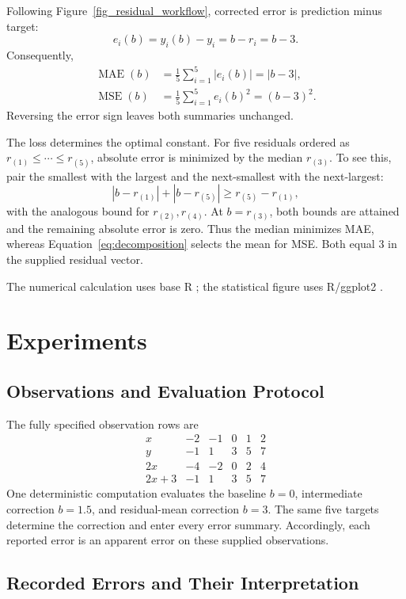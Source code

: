 \documentclass[11pt]{article}
\begin{document}
Following Figure~\ref{fig_residual_workflow}, corrected error is prediction minus target:
\[
e_i(b)=\hat y_i(b)-y_i=b-r_i=b-3.
\]
Consequently,
\begin{align}
\operatorname{MAE}(b)
&=\frac{1}{5}\sum_{i=1}^{5}|e_i(b)|=|b-3|,
\label{eq:mae}\\
\operatorname{MSE}(b)
&=\frac{1}{5}\sum_{i=1}^{5}e_i(b)^2=(b-3)^2.
\label{eq:mse}
\end{align}
Reversing the error sign leaves both summaries unchanged.

The loss determines the optimal constant. For five residuals ordered as
$r_{(1)}\leq\cdots\leq r_{(5)}$, absolute error is minimized by the median $r_{(3)}$. To see this, pair the smallest with the largest and the next-smallest with the next-largest:
\[
|b-r_{(1)}|+|b-r_{(5)}|\geq r_{(5)}-r_{(1)},
\]
with the analogous bound for $r_{(2)},r_{(4)}$.
At $b=r_{(3)}$, both bounds are attained and the remaining absolute error is zero. Thus the median minimizes MAE, whereas Equation~\ref{eq:decomposition} selects the mean for MSE. Both equal $3$ in the supplied residual vector.

The numerical calculation uses base R \cite{Ihaka1996RLanguage}; the statistical figure uses R/ggplot2 \cite{Wickham2009LayeredGrammar}.

\section{Experiments}
\subsection{Observations and Evaluation Protocol}

The fully specified observation rows are
\[
\begin{array}{c|rrrrr}
x & -2 & -1 & 0 & 1 & 2\\
y & -1 & 1 & 3 & 5 & 7\\
2x & -4 & -2 & 0 & 2 & 4\\
2x+3 & -1 & 1 & 3 & 5 & 7
\end{array}
\]
One deterministic computation evaluates the baseline $b=0$, intermediate correction $b=1.5$, and residual-mean correction $b=3$. The same five targets determine the correction and enter every error summary. Accordingly, each reported error is an apparent error on these supplied observations.

\subsection{Recorded Errors and Their Interpretation}
\end{document}
